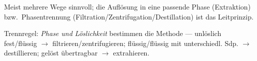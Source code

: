 \begin{kontrolle}
Meist mehrere Wege sinnvoll; die Auflösung in eine passende Phase
(Extraktion) bzw.\ Phasentrennung (Filtration/Zentrifugation/Destillation) ist
das Leitprinzip.
\end{kontrolle}

\begin{merksatz}
Trennregel: \emph{Phase und Löslichkeit} bestimmen die Methode ---
unlöslich fest/flüssig $\rightarrow$ filtrieren/zentrifugieren; flüssig/flüssig mit
unterschiedl. Sdp. $\rightarrow$ destillieren; gelöst übertragbar $\rightarrow$ extrahieren.
\end{merksatz}

